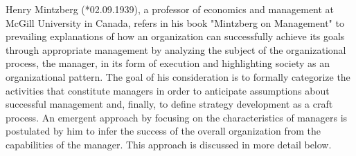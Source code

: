 \documentclass[a4paper,12pt]{article}
\begin{document}
Henry Mintzberg (*02.09.1939), a professor of economics and management at
McGill University in Canada, refers in his book "Mintzberg on Management" to
prevailing explanations of how an organization can successfully achieve its
goals through appropriate management by analyzing the subject of the
organizational process, the manager, in its form of execution and highlighting
society as an organizational pattern. The goal of his consideration is to
formally categorize the activities that constitute managers in order to
anticipate assumptions about successful management and, finally, to define
strategy development as a craft process. An emergent approach by focusing on
the characteristics of managers is postulated by him to infer the success of
the overall organization from the capabilities of the manager. This approach
is discussed in more detail below.
\end{document}
